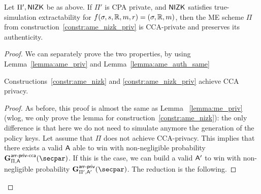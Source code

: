 \begin{theorem}\label{theo:ame_nizk_priv}
    Let $\Pi', \mathsf{NIZK}$ be as above.
    If $\Pi'$ is CPA private, and $\mathsf{NIZK}$ satisfies true-simulation extractability for $f(\sigma, s, \mathbb{R}, m, r) = (\sigma, \mathbb{R}, m)$, then the ME scheme $\Pi$ from construction~\ref{constr:ame_nizk_priv} is CCA-private and preserves its authenticity.
\end{theorem}

\begin{proof}
    We can separately prove the two properties, by using Lemma~\ref{lemma:ame_priv} and Lemma~\ref{lemma:ame_auth_same}

    \begin{lemma}\label{lemma:ame_priv}
        Constructions~\ref{constr:ame_nizk} and \ref{constr:ame_nizk_priv} achieve CCA privacy.
        \begin{proof}
            As before, this proof is almost the same as Lemma ~\ref{lemma:me_priv} (wlog, we only prove the lemma for construction~\ref{constr:ame_nizk}): the only difference is that here we do not need to simulate anymore the generation of the policy keys.
            Let assume that $\Pi$ does not achieve CCA-privacy.
            This implies that there exists a valid $\mathsf{A}$ able to win with non-negligible probability $\NISHmatchgamecca{\arranged}_{\Pi, \adversary}(\secpar)$.
            If this is the case, we can build a valid $\mathsf{A}'$ to win with non-negligible probability $\NISHmatchgame{\arranged}_{\Pi', \adversary'}(\secpar)$.
            The reduction is the following.


\end{proof}
\end{lemma}
\end{proof}
